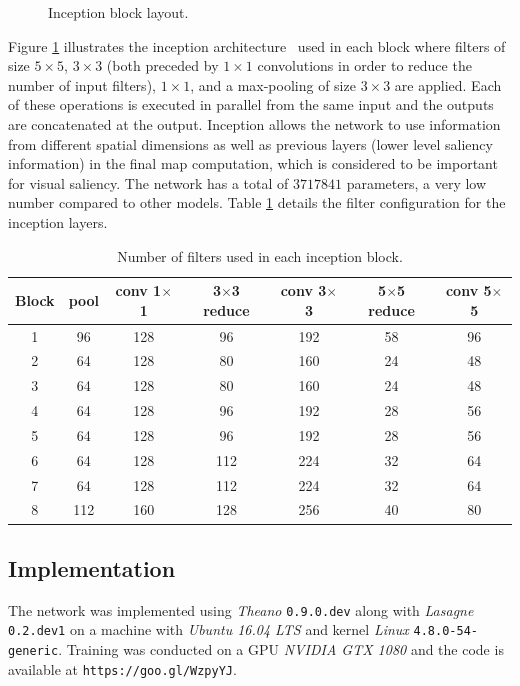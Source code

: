\documentclass[12pt]{article}
\begin{document}
\begin{figure}[!htb]
    \centering
    \def\svgwidth{0.57\linewidth}
    
    \caption{Inception block layout.}
   \label{fig:newinception}
\end{figure}

Figure \ref{fig:newinception} illustrates the inception
architecture~\cite{szegedy_2014}
used in each block where filters of size $5 \times 5$, $3 \times 3$
(both preceded by $1\times 1$ convolutions in order to reduce the number
of input filters), $1 \times 1$, and a max-pooling of size $3 \times 3$ are applied.
Each of these operations is executed in parallel from the same input
and the outputs are concatenated at the output.
Inception allows the network to use
information from different spatial dimensions as well as previous
layers (lower level saliency information) in the final map
computation, which is considered to be important for visual saliency.
The network has a total of $3717841$ parameters, a very low number
compared to other models. Table \ref{table:inception} details the filter configuration for the inception layers.

\begin{table}[H]
\centering
	\small
\label{table:inception}
\caption{Number of filters used in each inception block.}
\begin{tabular}{|c|c|c|c|c|c|c|}
	\hline
    Block & pool & conv 1$\times$1 & 3$\times$3 reduce &
    conv 3$\times$3 & 5$\times$5 reduce & conv 5$\times$5\\
    \hline
    1 & 96 & 128 & 96 & 192 & 58 & 96\\
    \hline
    2 & 64 & 128 & 80 & 160 & 24 & 48\\
    \hline
    3 & 64 & 128 & 80 & 160 & 24 & 48\\
    \hline
    4 & 64 & 128 & 96 & 192 & 28 & 56\\
    \hline
    5 & 64 & 128 & 96 & 192 & 28 & 56\\
    \hline
    6 & 64 & 128 & 112 & 224 & 32 & 64\\
    \hline
    7 & 64 & 128 & 112 & 224 & 32 & 64\\
    \hline
    8 & 112 & 160 & 128 & 256 & 40 & 80\\
    \hline
\end{tabular}
\end{table}

\subsection{Implementation}
The network was implemented using \emph{Theano} \texttt{0.9.0.dev}
along with \emph{Lasagne} \texttt{0.2.dev1}
on a machine with \emph{Ubuntu 16.04 LTS} and
kernel \emph{Linux} \texttt{4.8.0-54-generic}.
Training was conducted on a GPU \emph{NVIDIA GTX 1080} and the
code is available at \texttt{https://goo.gl/WzpyYJ}.
\end{document}
